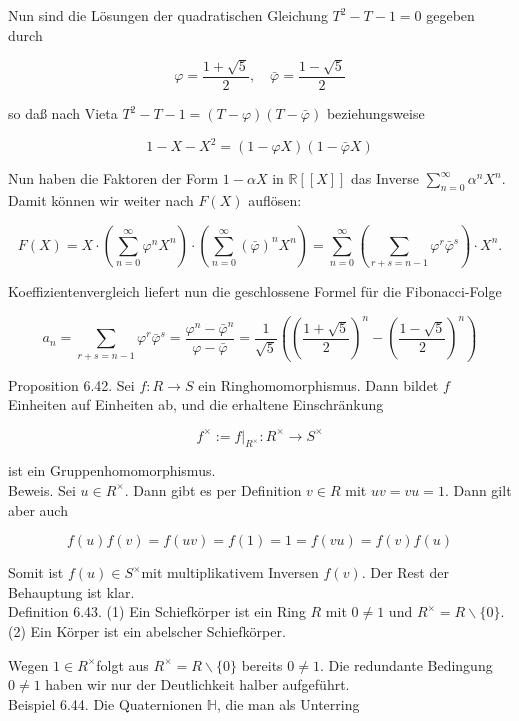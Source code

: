 \documentclass[10pt, letterpaper]{article}
\begin{document}
Nun sind die Lösungen der quadratischen Gleichung $T^{2}-T-1=0$ gegeben durch

$$
\varphi=\frac{1+\sqrt{5}}{2}, \quad \bar{\varphi}=\frac{1-\sqrt{5}}{2}
$$

so daß nach Vieta $T^{2}-T-1=(T-\varphi)(T-\bar{\varphi})$ beziehungsweise

$$
1-X-X^{2}=(1-\varphi X)(1-\bar{\varphi} X)
$$

Nun haben die Faktoren der Form $1-\alpha X$ in $\mathbb{R}[[X]]$ das Inverse $\sum_{n=0}^{\infty} \alpha^{n} X^{n}$. Damit können wir weiter nach $F(X)$ auflösen:

$$
F(X)=X \cdot\left(\sum_{n=0}^{\infty} \varphi^{n} X^{n}\right) \cdot\left(\sum_{n=0}^{\infty}(\bar{\varphi})^{n} X^{n}\right)=\sum_{n=0}^{\infty}\left(\sum_{r+s=n-1} \varphi^{r} \bar{\varphi}^{s}\right) \cdot X^{n} .
$$

Koeffizientenvergleich liefert nun die geschlossene Formel für die Fibonacci-Folge

$$
a_{n}=\sum_{r+s=n-1} \varphi^{r} \bar{\varphi}^{s}=\frac{\varphi^{n}-\bar{\varphi}^{n}}{\varphi-\bar{\varphi}}=\frac{1}{\sqrt{5}}\left(\left(\frac{1+\sqrt{5}}{2}\right)^{n}-\left(\frac{1-\sqrt{5}}{2}\right)^{n}\right)
$$

Proposition 6.42. Sei $f: R \rightarrow S$ ein Ringhomomorphismus. Dann bildet $f$ Einheiten auf Einheiten ab, und die erhaltene Einschränkung

$$
f^{\times}:=\left.f\right|_{R^{\times}}: R^{\times} \rightarrow S^{\times}
$$

ist ein Gruppenhomomorphismus.\\
Beweis. Sei $u \in R^{\times}$. Dann gibt es per Definition $v \in R$ mit $u v=v u=1$. Dann gilt aber auch

$$
f(u) f(v)=f(u v)=f(1)=1=f(v u)=f(v) f(u)
$$

Somit ist $f(u) \in S^{\times}$mit multiplikativem Inversen $f(v)$. Der Rest der Behauptung ist klar.\\
Definition 6.43. (1) Ein Schiefkörper ist ein Ring $R$ mit $0 \neq 1$ und $R^{\times}=R \backslash\{0\}$.\\
(2) Ein Körper ist ein abelscher Schiefkörper.

Wegen $1 \in R^{\times}$folgt aus $R^{\times}=R \backslash\{0\}$ bereits $0 \neq 1$. Die redundante Bedingung $0 \neq 1$ haben wir nur der Deutlichkeit halber aufgeführt.\\
Beispiel 6.44. Die Quaternionen $\mathbb{H}$, die man als Unterring
\end{document}
